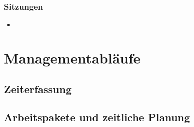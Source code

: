 \subsubsection*{Sitzungen}


\begin{itemize}
\item 
\end{itemize}

\section{Managementabläufe}

\subsection{Zeiterfassung}


\subsection{Arbeitspakete und zeitliche Planung}

% 
% 
% 
% 

